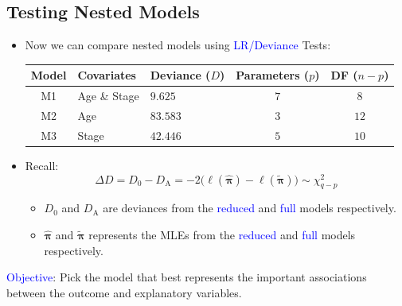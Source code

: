 \documentclass{article}\usepackage[]{graphicx}\usepackage[svgnames]{xcolor}
\providecommand{\Vector}[1]{\bm{#1}}%
\begin{document}
\subsection*{Testing Nested Models}
\begin{itemize}
    \item Now we can compare nested models using \textcolor{Blue}{LR/Deviance} Tests:
          \begin{table}[!htbp]
              \centering
              \begin{tabular}{cllcc}
                  \toprule
                  Model & Covariates   & Deviance ($ D $) & Parameters ($ p $) & DF ($ n-p $) \\
                  \midrule
                  M1    & Age \& Stage & $9.625$          & $ 7 $              & $ 8 $        \\
                  M2    & Age          & $83.583$         & $ 3 $              & $ 12 $       \\
                  M3    & Stage        & $42.446$         & $ 5 $              & $ 10 $       \\
                  \bottomrule
              \end{tabular}
          \end{table}
    \item Recall:
          \[ \Delta D=D_0-D_\text{A}=-2\bigl(\ell(\hat{\Vector{\pi}})-\ell(\tilde{\Vector{\pi}})\bigr) \sim \chi^2_{q-p} \]
          \begin{itemize}
              \item $ D_0 $ and $ D_\text{A} $ are deviances from the \textcolor{Blue}{reduced} and \textcolor{Blue}{full} models respectively.
              \item $ \hat{\Vector{\pi}} $ and $ \tilde{\Vector{\pi}} $ represents the MLEs from the \textcolor{Blue}{reduced} and \textcolor{Blue}{full} models respectively.
          \end{itemize}
\end{itemize}
\begin{Example}{}
    \textcolor{Blue}{Objective}: Pick the model that best represents the important associations between the
    outcome and explanatory variables.
\end{Example}
\end{document}
